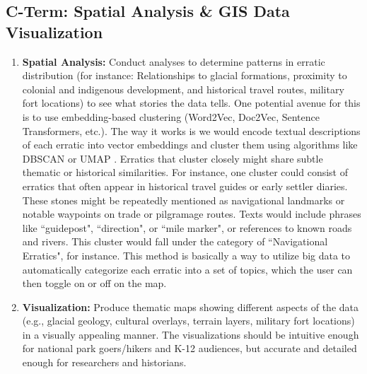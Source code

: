 \documentclass{article}
\begin{document}
\subsection{C-Term: Spatial Analysis \& GIS Data Visualization}\label{sec:SpatialAnalysis}
\begin{enumerate}
    \item \textbf{Spatial Analysis:} Conduct analyses to determine patterns in erratic distribution (for instance: Relationships to glacial formations, proximity to colonial and indigenous development, and historical travel routes, military fort locations) to see what stories the data tells. One potential avenue for this is to use embedding-based clustering (Word2Vec, Doc2Vec, Sentence Transformers, etc.). The way it works is we would encode textual descriptions of each erratic into vector embeddings and cluster them using algorithms like DBSCAN \cite{Deng2020} or UMAP \cite{Healy2024}. Erratics that cluster closely might share subtle thematic or historical similarities. For instance, one cluster could consist of erratics that often appear in historical travel guides or early settler diaries. These stones might be repeatedly mentioned as navigational landmarks or notable waypoints on trade or pilgramage routes. Texts would include phrases like ``guidepost", ``direction", or ``mile marker", or references to known roads and rivers. This cluster would fall under the category of ``Navigational Erratics", for instance. This method is basically a way to utilize big data to automatically categorize each erratic into a set of topics, which the user can then toggle on or off on the map.

    \item \textbf{Visualization:} Produce thematic maps showing different aspects of the data (e.g., glacial geology, cultural overlays, terrain layers, military fort locations) in a visually appealing manner. The visualizations should be intuitive enough for national park goers/hikers and K-12 audiences, but accurate and detailed enough for researchers and historians.
\end{enumerate}
\end{document}

